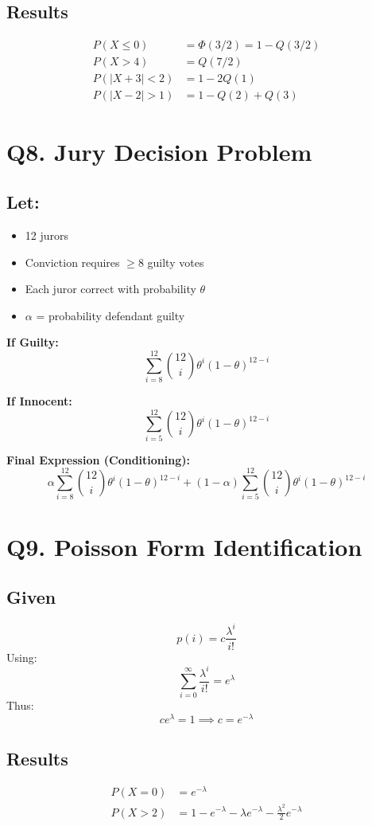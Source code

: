 \documentclass[11pt]{article}
\begin{document}
\subsection{Results}
\begin{align*}
    P(X \le 0) &= \Phi(3/2) = 1 - Q(3/2) \\
    P(X > 4) &= Q(7/2) \\
    P(|X+3| < 2) &= 1 - 2Q(1) \\
    P(|X-2| > 1) &= 1 - Q(2) + Q(3)
\end{align*}

\section{Q8. Jury Decision Problem}

\subsection{Let:}
\begin{itemize}
    \item 12 jurors
    \item Conviction requires $\ge 8$ guilty votes
    \item Each juror correct with probability $\theta$
    \item $\alpha$ = probability defendant guilty
\end{itemize}

\textbf{If Guilty:}
\[ \sum_{i=8}^{12} \binom{12}{i} \theta^i (1-\theta)^{12-i} \]

\textbf{If Innocent:}
\[ \sum_{i=5}^{12} \binom{12}{i} \theta^i (1-\theta)^{12-i} \]

\textbf{Final Expression (Conditioning):}
\[ \alpha \sum_{i=8}^{12} \binom{12}{i} \theta^i (1-\theta)^{12-i} + (1-\alpha) \sum_{i=5}^{12} \binom{12}{i} \theta^i (1-\theta)^{12-i} \]

\section{Q9. Poisson Form Identification}

\subsection{Given}
\[ p(i) = c \frac{\lambda^i}{i!} \]
Using:
\[ \sum_{i=0}^{\infty} \frac{\lambda^i}{i!} = e^\lambda \]
Thus:
\[ c e^\lambda = 1 \implies c = e^{-\lambda} \]

\subsection{Results}
\begin{align*}
    P(X=0) &= e^{-\lambda} \\
    P(X>2) &= 1 - e^{-\lambda} - \lambda e^{-\lambda} - \frac{\lambda^2}{2} e^{-\lambda}
\end{align*}
\end{document}
